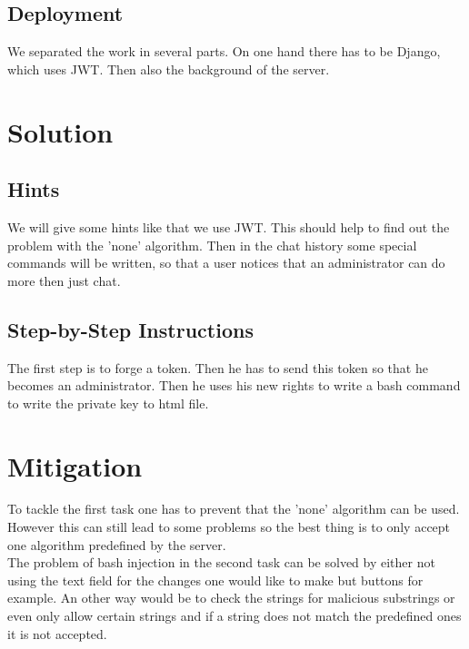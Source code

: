 \documentclass[12pt,a4paper]{article}
\begin{document}
\subsection{Deployment}
We separated the work in several parts. On one hand there has to be Django, which uses JWT. Then also the background of the server.

\section{Solution}

\subsection{Hints}
We will give some hints like that we use JWT. This should help to find out the problem with the 'none' algorithm. Then in the chat history some special commands will be written, so that a user notices that an administrator can do more then just chat.
\subsection{Step-by-Step Instructions}
The first step is to forge a token. Then he has to send this token so that he becomes an administrator. Then he uses his new rights to write a bash command to write the private key to html file.
\section{Mitigation}

To tackle the first task one has to prevent that the 'none' algorithm can be used. However this can still lead to some problems so the best thing is to only accept one algorithm predefined by the server.\\
The problem of bash injection in the second task can be solved by either not using the text field for the changes one would like to make but buttons for example. An other way would be to check the strings for malicious substrings or even only allow certain strings and if a string does not match the predefined ones it is not accepted.
\end{document}
